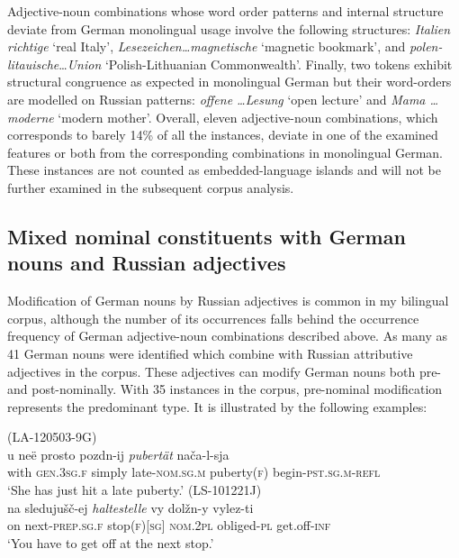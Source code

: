\begin{sloppypar}
Adjective-noun combinations whose word order patterns and internal structure deviate from German monolingual usage involve the following structures: \textit{Italien richtige} `real Italy', \textit{Lesezeichen\dots magnetische} `magnetic bookmark', and \textit{polen-litauische}\dots \textit{Union} `Polish-Lithuanian Commonwealth'. Finally, two tokens exhibit structural congruence as expected in monolingual German but their word-orders are modelled on Russian patterns: \textit{offene \dots Lesung} `open lecture' and \textit{Mama \dots moderne} `modern mother'. Overall, eleven adjective-noun combinations, which corresponds to barely 14\% of all the instances, deviate in one of the examined features or both from the corresponding combinations in monolingual German. These instances are not counted as embedded-language islands and will not be further examined in the subsequent corpus analysis. 
\end{sloppypar}

\subsection{Mixed nominal constituents with German nouns and Russian adjectives}

Modification of German nouns by Russian adjectives is common in my bilingual corpus, although the number of its occurrences falls behind the occurrence frequency of German adjective-noun combinations described above. As many as 41 German nouns were identified which combine with Russian attributive adjectives in the corpus. These adjectives can modify German nouns both pre- and post-nominally. With 35 instances in the corpus, pre-nominal modification represents the predominant type. It is illustrated by the following examples:

\ea 
\label{ex:4:37}
(LA-120503-9G)\\
    \gll u neë prosto pozdn-ij \textit{pubertät}  nača-l-sja\\
    with	\textsc{gen.3sg.f} 	simply late-\textsc{nom.sg.m}  puberty(\textsc{f})  begin-\textsc{pst.sg.m-refl}\\
\glt `She has just hit a late puberty.'
\ex 
\label{ex:4:38}
(LS-101221J)\\
    \gll na sledujušč-ej \textit{haltestelle}  vy dolžn-y vylez-ti\\
    on	next-\textsc{prep.sg.f} 	stop\textsc{(f)[sg]}	 \textsc{nom.2pl} 	obliged-\textsc{pl} get.off-\textsc{inf}\\
\glt `You have to get off at the next stop.'
\z

